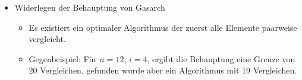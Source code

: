 \begin{frame}
  \begin{itemize}
    \item Widerlegen der Behauptung von Gasarch
          \begin{itemize}
            \item Es existiert ein optimaler Algorithmus der zuerst alle Elemente paarweise vergleicht.
            \item Gegenbeispiel: Für $n = 12$, $i = 4$, ergibt die Behauptung eine Grenze von 20
                  Vergleichen, gefunden wurde aber ein Algorithmus mit 19 Vergleichen.
          \end{itemize}
  \end{itemize}
\end{frame}

\begin{frame}


\end{frame}
